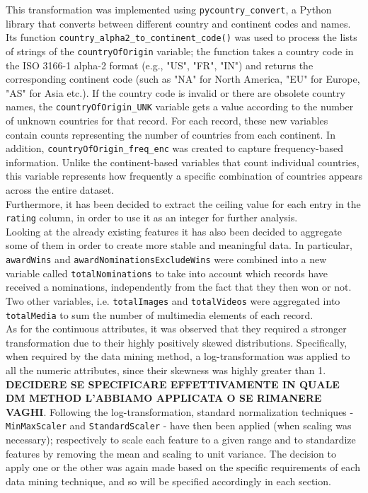 This transformation was implemented using \texttt{pycountry\_convert}, a Python library that converts between different country and continent codes and names. 
Its function \texttt{country\_alpha2\_to\_continent\_code()} was used to process the lists of strings of the \texttt{countryOfOrigin} variable;
the function takes a country code in the ISO 3166-1 alpha-2 format (e.g., "US", "FR", "IN") and returns the corresponding continent code (such as "NA" for North America, "EU" for Europe, "AS" for Asia etc.). 
If the country code is invalid or there are obsolete country names, the \texttt{countryOfOrigin\_UNK} variable gets a value according to the number of unknown countries for that record. 
For each record, these new variables contain counts representing the number of countries from each continent.
In addition, \texttt{countryOfOrigin\_freq\_enc} was created to capture frequency-based information. 
Unlike the continent-based variables that count individual countries, this variable represents how frequently a specific combination of countries appears across the entire dataset.\\
Furthermore, it has been decided to extract the ceiling value for each entry in the \texttt{rating} column, in order to use it as an integer for further analysis.\\
Looking at the already existing features it has also been decided to aggregate some of them in order to create more stable and meaningful data. 
In particular, \texttt{awardWins} and \texttt{awardNominationsExcludeWins} were combined into a new variable called \texttt{totalNominations} to take into account
which records have received a nominations, independently from the fact that they then won or not.
Two other variables, i.e. \texttt{totalImages} and \texttt{totalVideos} were aggregated into \texttt{totalMedia} to sum the number of multimedia elements
of each record.\\

As for the continuous attributes, it was observed that they required a stronger transformation due to their highly positively skewed distributions. 
Specifically, when required by the data mining method, a log-transformation was applied to all the numeric attributes, since their skewness was highly greater than 1. 
\textbf{DECIDERE SE SPECIFICARE EFFETTIVAMENTE IN QUALE DM METHOD L'ABBIAMO APPLICATA O SE RIMANERE VAGHI}.
Following the log-transformation, standard normalization techniques - \texttt{MinMaxScaler} and \texttt{StandardScaler} - have then been applied (when scaling was necessary); 
respectively to scale each feature to a given range and to standardize features by removing the mean and scaling to unit variance.
The decision to apply one or the other was again made based on the specific requirements of each data mining technique, and so will be specified accordingly in each section.

